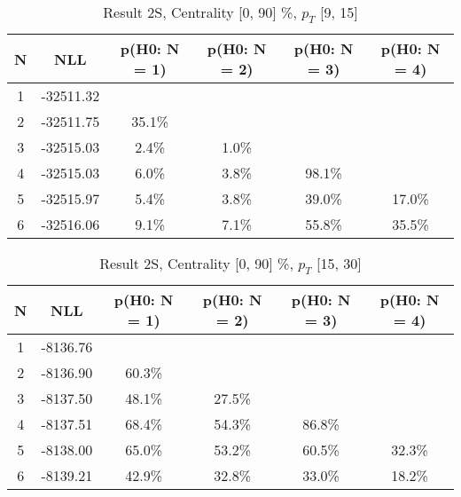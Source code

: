 \begin{table}[htb]
	\begin{center}
	\caption{Result 2S, Centrality [0, 90] \%, $p_{T}$ [9, 15] \GeV
}
{\footnotesize\renewcommand{\arraystretch}{1.4}
		\begin{tabular}{cc||cc>{\columncolor[gray]{0.8}}cc}
			N & NLL & p(H0: N = 1) & p(H0: N = 2) & p(H0: N = 3) & p(H0: N = 4)\\ 
		\hline
1 & -32511.32 & & & & \\
2 & -32511.75 & 35.1\% & & & \\
3 & -32515.03 & 2.4\% & 1.0\% & & \\
4 & -32515.03 & 6.0\% & 3.8\% & 98.1\% & \\
5 & -32515.97 & 5.4\% & 3.8\% & 39.0\% & 17.0\% \\
6 & -32516.06 & 9.1\% & 7.1\% & 55.8\% & 35.5\% \\
	\end{tabular}
		\label{tab:lab}
	}
	\end{center}\end{table}

\begin{table}[htb]
	\begin{center}
	\caption{Result 2S, Centrality [0, 90] \%, $p_{T}$ [15, 30] \GeV
}
{\footnotesize\renewcommand{\arraystretch}{1.4}
		\begin{tabular}{cc||>{\columncolor[gray]{0.8}}cccc}
			N & NLL & p(H0: N = 1) & p(H0: N = 2) & p(H0: N = 3) & p(H0: N = 4)\\ 
		\hline
1 & -8136.76 & & & & \\
2 & -8136.90 & 60.3\% & & & \\
3 & -8137.50 & 48.1\% & 27.5\% & & \\
4 & -8137.51 & 68.4\% & 54.3\% & 86.8\% & \\
5 & -8138.00 & 65.0\% & 53.2\% & 60.5\% & 32.3\% \\
6 & -8139.21 & 42.9\% & 32.8\% & 33.0\% & 18.2\% \\
	\end{tabular}
		\label{tab:lab}
	}
	\end{center}\end{table}

